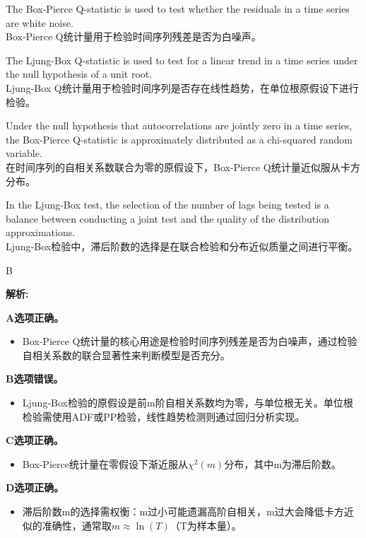 \documentclass{article}
\newenvironment{explanation}
{\textbf{解析:}\par}
{\par}
\begin{document}
    \begin{choices}
        \item The Box-Pierce Q-statistic is used to test whether the residuals in a time series are white noise.\\
        Box-Pierce Q统计量用于检验时间序列残差是否为白噪声。
        \item The Ljung-Box Q-statistic is used to test for a linear trend in a time series under the null hypothesis of a unit root.\\
        Ljung-Box Q统计量用于检验时间序列是否存在线性趋势，在单位根原假设下进行检验。
        \item Under the null hypothesis that autocorrelations are jointly zero in a time series, the Box-Pierce Q-statistic is approximately distributed as a chi-squared random variable.\\
        在时间序列的自相关系数联合为零的原假设下，Box-Pierce Q统计量近似服从卡方分布。
        \item In the Ljung-Box test, the selection of the number of lags being tested is a balance between conducting a joint test and the quality of the distribution approximations.\\
        Ljung-Box检验中，滞后阶数的选择是在联合检验和分布近似质量之间进行平衡。
    \end{choices}
    
    \begin{correctanswer}
        B
    \end{correctanswer}
    
    \begin{explanation}
    \textbf{A选项正确。}
    \begin{itemize}
        \item Box-Pierce Q统计量的核心用途是检验时间序列残差是否为白噪声，通过检验自相关系数的联合显著性来判断模型是否充分。
    \end{itemize}
    \textbf{B选项错误。}
    \begin{itemize}
        \item Ljung-Box检验的原假设是前m阶自相关系数均为零，与单位根无关。单位根检验需使用ADF或PP检验，线性趋势检测则通过回归分析实现。
    \end{itemize}
    \textbf{C选项正确。}
    \begin{itemize}
        \item Box-Pierce统计量在零假设下渐近服从\(\chi^2(m)\)分布，其中m为滞后阶数。
    \end{itemize}
    \textbf{D选项正确。}
    \begin{itemize}
        \item 滞后阶数m的选择需权衡：m过小可能遗漏高阶自相关，m过大会降低卡方近似的准确性，通常取\(m \approx \ln(T)\)（T为样本量）。
    \end{itemize}
    \end{explanation}
    
\end{document}
